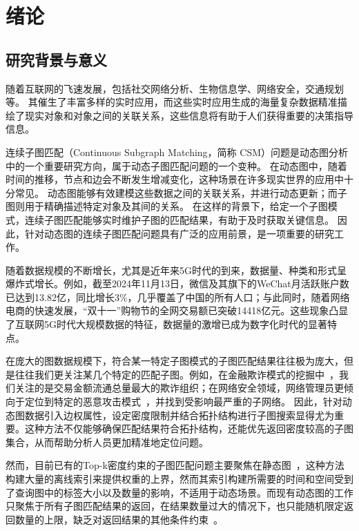 \chapter{绪论}
\section{研究背景与意义}
随着互联网的飞速发展，包括社交网络分析、生物信息学、网络安全，交通规划等。
其催生了丰富多样的实时应用，而这些实时应用生成的海量复杂数据精准描绘了现实对象和对象之间的关联关系，这些信息将有助于人们获得重要的决策指导信息。

连续子图匹配（Continuous Subgraph Matching，简称 CSM）问题是动态图分析中的一个重要研究方向，属于动态子图匹配问题的一个变种。
在动态图中，随着时间的推移，节点和边会不断发生增减变化，这种场景在许多现实世界的应用中十分常见。
动态图能够有效建模这些数据之间的关联关系，并进行动态更新；而子图则用于精确描述特定对象及其间的关系。
在这样的背景下，给定一个子图模式，连续子图匹配能够实时维护子图的匹配结果，有助于及时获取关键信息。
因此，针对动态图的连续子图匹配问题具有广泛的应用前景，是一项重要的研究工作。

随着数据规模的不断增长，尤其是近年来5G时代的到来，数据量、种类和形式呈爆炸式增长。例如，截至2024年11月13日，微信及其旗下的WeChat月活跃账户数已达到13.82亿，同比增长3\%，几乎覆盖了中国的所有人口；与此同时，随着网络电商的快速发展，“双十一”购物节的全网交易额已突破14418亿元。这些现象凸显了互联网5G时代大规模数据的特征，数据量的激增已成为数字化时代的显著特点。

在庞大的图数据规模下，符合某一特定子图模式的子图匹配结果往往极为庞大，但是往往我们更关注某几个特定的匹配子图。例如，在金融欺诈模式的挖掘中~\cite{csm-cycle-DBLP:journals/pvldb/QiuCQPZLZ18}，我们关注的是交易金额流通总量最大的欺诈组织；在网络安全领域，网络管理员更倾向于定位到特定的恶意攻击模式~\cite{traffic-graph-matching-DBLP:journals/pvldb/SongGCW14}，并找到受影响最严重的子网络。
因此，针对动态图数据引入边权属性，设定密度限制并结合拓扑结构进行子图搜索显得尤为重要。这种方法不仅能够确保匹配结果符合拓扑结构，还能优先返回密度较高的子图集合，从而帮助分析人员更加精准地定位问题。

然而，目前已有的Top-k密度约束的子图匹配问题主要聚焦在静态图~\cite{density-define-DBLP:journals/vldb/AngelKSSST14,dsm-noweight-Bahmani-DBLP:journals/pvldb/BahmaniKV12}，这种方法构建大量的离线索引来提供权重的上界，然而其索引构建所需要的时间和空间受到了查询图中的标签大小以及数量的影响，不适用于动态场景。而现有动态图的工作只聚焦于所有子图匹配结果的返回，在结果数量过大的情况下，也只能随机限定返回数量的上限，缺乏对返回结果的其他条件约束~\cite{csm-sjtree-DBLP:conf/edbt/ChoudhuryHCAF15,csm-IncIsoMatch-DBLP:conf/sigmod/FanLLTWW11,dsm-noweight-Hu-DBLP:conf/cikm/HuWC17,csm-turboflux-DBLP:conf/sigmod/KimSHLHCSJ18,csm-graphflowpp-DBLP:journals/tods/MhedhbiKS21,csm-symbi-DBLP:journals/pvldb/MinPPGIH21,csm-rapidflow-DBLP:journals/pvldb/SunSHL22}。

